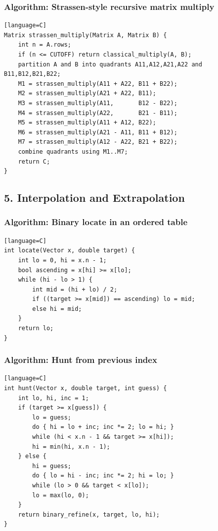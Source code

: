 \documentclass[11pt]{article}
\begin{document}
\subsubsection{Algorithm: Strassen-style recursive matrix multiply}\label{algorithm-strassen-style-recursive-matrix-multiply}

\begin{verbatim}[language=C]
Matrix strassen_multiply(Matrix A, Matrix B) {
    int n = A.rows;
    if (n <= CUTOFF) return classical_multiply(A, B);
    partition A and B into quadrants A11,A12,A21,A22 and B11,B12,B21,B22;
    M1 = strassen_multiply(A11 + A22, B11 + B22);
    M2 = strassen_multiply(A21 + A22, B11);
    M3 = strassen_multiply(A11,       B12 - B22);
    M4 = strassen_multiply(A22,       B21 - B11);
    M5 = strassen_multiply(A11 + A12, B22);
    M6 = strassen_multiply(A21 - A11, B11 + B12);
    M7 = strassen_multiply(A12 - A22, B21 + B22);
    combine quadrants using M1..M7;
    return C;
}
\end{verbatim}

\subsection{5. Interpolation and Extrapolation}\label{interpolation-and-extrapolation}

\subsubsection{Algorithm: Binary locate in an ordered table}\label{algorithm-binary-locate-in-an-ordered-table}

\begin{verbatim}[language=C]
int locate(Vector x, double target) {
    int lo = 0, hi = x.n - 1;
    bool ascending = x[hi] >= x[lo];
    while (hi - lo > 1) {
        int mid = (hi + lo) / 2;
        if ((target >= x[mid]) == ascending) lo = mid;
        else hi = mid;
    }
    return lo;
}
\end{verbatim}

\subsubsection{Algorithm: Hunt from previous index}\label{algorithm-hunt-from-previous-index}

\begin{verbatim}[language=C]
int hunt(Vector x, double target, int guess) {
    int lo, hi, inc = 1;
    if (target >= x[guess]) {
        lo = guess;
        do { hi = lo + inc; inc *= 2; lo = hi; }
        while (hi < x.n - 1 && target >= x[hi]);
        hi = min(hi, x.n - 1);
    } else {
        hi = guess;
        do { lo = hi - inc; inc *= 2; hi = lo; }
        while (lo > 0 && target < x[lo]);
        lo = max(lo, 0);
    }
    return binary_refine(x, target, lo, hi);
}
\end{verbatim}
\end{document}
